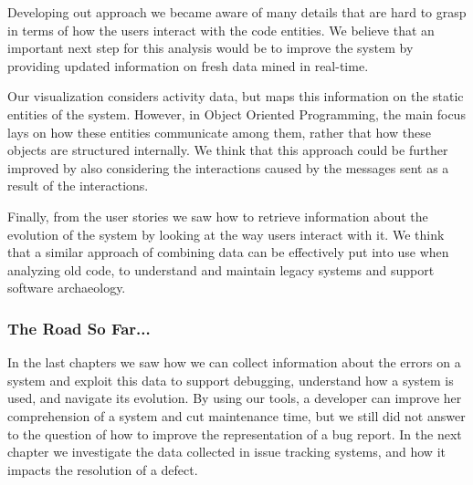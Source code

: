 Developing out approach we became aware of many details that are hard to grasp in terms of how the users interact with the code entities.
We believe that an important next step for this analysis would be to improve the system by providing updated information on fresh data mined in real-time.

Our visualization considers activity data, but maps this information on the static entities of the system.
However, in Object Oriented Programming, the main focus lays on how these entities communicate among them, rather that how these objects are structured internally.
We think that this approach could be further improved by also considering the interactions caused by the messages sent as a result of the interactions.

Finally, from the user stories we saw how to retrieve information about the evolution of the system by looking at the way users interact with it.
We think that a similar approach of combining data can be effectively put into use when analyzing old code, to understand and maintain legacy systems and support software archaeology.


\subsubsection{The Road So Far...}

In the last chapters we saw how we can collect information about the errors on a system and exploit this data to support debugging, understand how a system is used, and navigate its evolution.
By using our tools, a developer can improve her comprehension of a system and cut maintenance time, but we still did not answer to the question of how to improve the representation of a bug report.
In the next chapter we investigate the data collected in issue tracking systems, and how it impacts the resolution of a defect.
